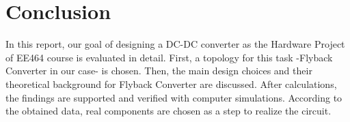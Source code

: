 \section{Conclusion}
\par In this report, our goal of designing a DC-DC converter as the Hardware Project of EE464 course is evaluated in detail. First, a topology for this task -Flyback Converter in our case- is chosen. Then, the main design choices and their theoretical background for Flyback Converter are discussed. After calculations, the findings are supported and verified with computer simulations. According to the obtained data, real components are chosen as a step to realize the circuit. 